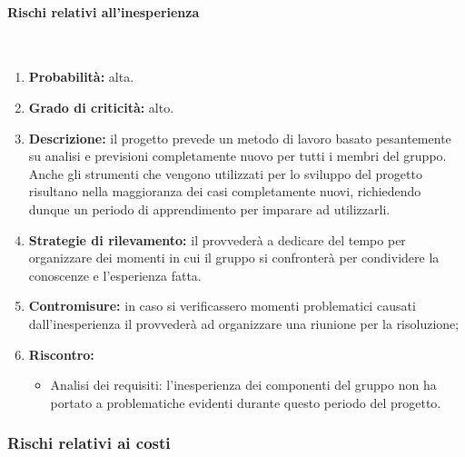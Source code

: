 \paragraph{Rischi relativi all'inesperienza}\mbox{}\\
\begin{enumerate}
	\item \textbf{Probabilità:} alta.
	\item \textbf{Grado di criticità:} alto.
	\item \textbf{Descrizione:} il progetto prevede un metodo di lavoro basato pesantemente su analisi e previsioni completamente nuovo per tutti i membri del gruppo. Anche gli strumenti che vengono utilizzati per lo sviluppo del progetto risultano nella maggioranza dei casi completamente nuovi, richiedendo dunque un periodo di apprendimento per imparare ad utilizzarli.
	\item \textbf{Strategie di rilevamento:} il \Responsabile{} provvederà a dedicare del tempo per organizzare dei momenti in cui il gruppo si confronterà per condividere la conoscenze e l'esperienza fatta.
	\item \textbf{Contromisure:} in caso si verificassero momenti problematici causati dall'inesperienza il \Responsabile{} provvederà ad organizzare una riunione per la risoluzione;
	\item \textbf{Riscontro:}
	\begin{itemize}
	\item Analisi dei requisiti: l'inesperienza dei componenti del gruppo non ha portato a problematiche evidenti durante questo periodo del progetto.
	\end{itemize}
\end{enumerate}

\subsubsection{Rischi relativi ai costi}
